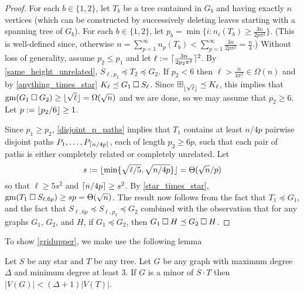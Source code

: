 \documentclass[../main.tex]{subfiles}
\begin{document}
	\begin{proof}
		For each $b\in\{1,2\}$, let $T_b$ be a tree contained in $G_b$ and having exactly $n$ vertices (which can be constructed by successively deleting leaves starting with a spanning tree of $G_b$).  
		For each $b\in\{1,2\}$, let $p_b=\min\{i: n_i(T_b)\ge \tfrac{3n}{2p\pi^2}\}$.  (This is well-defined since, otherwise $n=\sum_{p=1}^\infty n_p(T_b) < \sum_{p=1}^\infty \tfrac{3n}{2p\pi^2} = \frac{n}{4}$.)  Without loss of generality, assume $p_2 \le p_1$ and let $\ell:=\lceil\tfrac{3n}{2p_2\pi^2}\rceil^2$. By \cref{same_height_unrelated}, $S_{\ell,p_2}\preceq T_2\preceq G_2$.  If $p_2 < 6$ then $\ell > \frac{n}{4\pi^2}\in\Omega(n)$ and by \cref{anything_times_star} $K_{\ell}\preceq G_1 \mathbin{\Box} S_\ell$.  Since $\boxplus_{\lfloor\sqrt{\ell}\rfloor}\preceq K_{\ell}$, this implies that $\operatorname{gm}(G_1\mathbin{\Box} G_2)\ge \lfloor\sqrt{\ell}\rfloor=\Omega(\sqrt{n})$ and we are done, so we may assume that $p_2\ge 6$. Let $p:=\lfloor p_2/6\rfloor\ge 1$.
		
		Since $p_1\ge p_2$, \cref{disjoint_p_paths} implies that $T_1$ contains at least $n/4p$ pairwise disjoint paths $P_1,\ldots,P_{\lceil n/4p\rceil}$, each of length $p_2\ge 6p$, such that each pair of paths is either completely related or completely unrelated.  Let
		\[
		s:=\lfloor\min\{\sqrt{\ell/5}, \sqrt{n/4p}\}\rfloor = \Theta(\sqrt{n}/p)
		\]
		so that $\ell \ge 5s^2$ and $\lceil n/4p\rceil\ge s^2$.  By \cref{star_times_star}, $\operatorname{gm}(T_1 \mathbin{\Box} S_{\ell,6p}) \ge sp=\Theta(\sqrt{n})$.  The result now follows from  the fact that $T_1\preceq G_1$, and the fact that $S_{\ell,6p}\preceq S_{\ell,p_2}\preceq G_2$ combined with the observation that for any graphs $G_1$, $G_2$, and $H$, if $G_1\preceq G_2$, then $G_1\mathbin{\Box} H\preceq G_2\mathbin{\Box} H$.
	\end{proof}	
	
	To show \cref{gridupper}, we make use the following lemma
	
	\begin{lem}
		\label{StarTree}
		Let $S$ be any star and $T$ be any tree. Let $G$ be any graph  with maximum degree $\Delta$ and minimum degree at least 3. If $G$ is a minor of $S \cdot T$ then $|V(G)|< (\Delta+1) |V(T)|$. 
	\end{lem}
	
\end{document}
